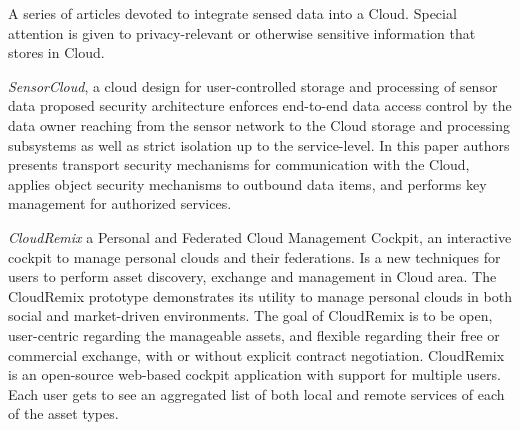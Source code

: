 	A series of articles devoted to integrate sensed data into a Cloud. Special attention is given to privacy-relevant or otherwise sensitive information that stores in Cloud. 

	\emph{SensorCloud}\cite{hummen2012cloud}, a cloud design for user-controlled storage and processing of sensor data proposed security architecture enforces end-to-end data access control by the data owner reaching from the sensor network to the Cloud storage and processing subsystems as well as strict isolation up to the service-level. In this paper authors presents transport security mechanisms for communication with the Cloud, applies object security mechanisms to outbound data items, and performs key management for authorized services. 

	\emph{CloudRemix\cite{spillner2013personal}} a Personal and Federated Cloud Management Cockpit, an interactive cockpit to manage personal clouds and their federations. Is a new techniques for users to perform asset discovery, exchange and management in Cloud area. The CloudRemix prototype demonstrates its utility to manage personal clouds in both social and market-driven environments. The goal of CloudRemix is to be open, user-centric regarding the manageable assets, and flexible regarding their free or commercial exchange, with or without explicit contract negotiation. CloudRemix is an open-source web-based cockpit application with support for multiple users. Each user gets to see an aggregated list of both local and remote services of each of the asset types.

